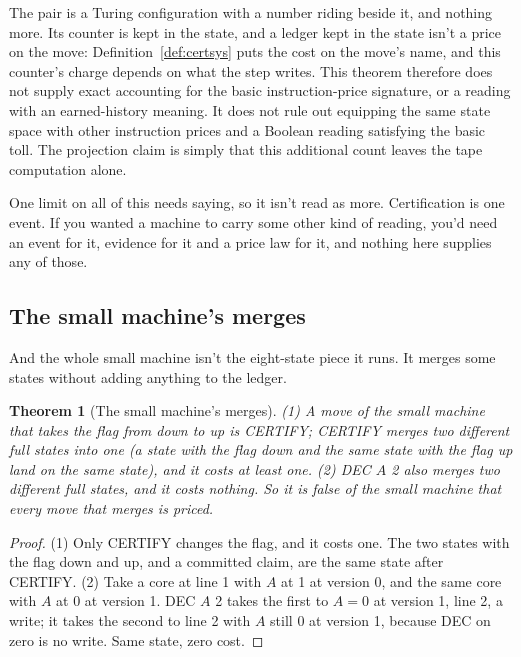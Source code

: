 \documentclass[11pt,twoside]{article}
\theoremstyle{thielethm}
\newtheorem{theorem}{Theorem}[section]
\theoremstyle{thieledef}
\theoremstyle{thieledef}
\theoremstyle{thieledef}
\theoremstyle{thielethm}
\theoremstyle{thieleobs}
\theoremstyle{thielethm}
\begin{document}
The pair is a Turing configuration with a number riding beside it, and nothing more. Its counter
is kept in the state, and a ledger kept in the state isn't a price on the move:
Definition~\ref{def:certsys} puts the cost on the move's name, and this counter's charge depends
on what the step writes. This theorem therefore does not supply exact accounting for the basic
instruction-price signature, or a reading with an earned-history meaning.
It does not rule out equipping the same state space with other instruction
prices and a Boolean reading satisfying the basic toll. The projection
claim is simply that this additional count leaves the tape computation alone.

One limit on all of this needs saying, so it isn't read as more. Certification is one event. If you wanted
a machine to carry some other kind of reading, you'd need an event for it, evidence for it and
a price law for it, and nothing here supplies any of those.

\subsection{The small machine's merges}

And the whole small machine isn't the eight-state piece it runs. It merges some states without
adding anything to the ledger.

\begin{theorem}[The small machine's merges]\label{thm:frag-merge-split}
(1) A move of the small machine that takes the flag from down to up is CERTIFY; CERTIFY merges two
different full states into one (a state with the flag down and the same state with the flag up land
on the same state), and it costs at least one. (2) DEC $A$ 2 also merges two different full states,
and it costs nothing. So it is false of the small machine that every move that merges is priced.
\end{theorem}

\begin{proof}
(1) Only CERTIFY changes the flag, and it costs one. The two states with the flag down and up, and
a committed claim, are the same state after CERTIFY. (2) Take a core at line 1 with $A$ at 1 at
version 0, and the same core with $A$ at 0 at version 1. DEC $A$ 2 takes the first to $A = 0$ at
version 1, line 2, a write; it takes the second to line 2 with $A$ still 0 at version 1, because
DEC on zero is no write. Same state, zero cost.
\end{proof}
\end{document}
